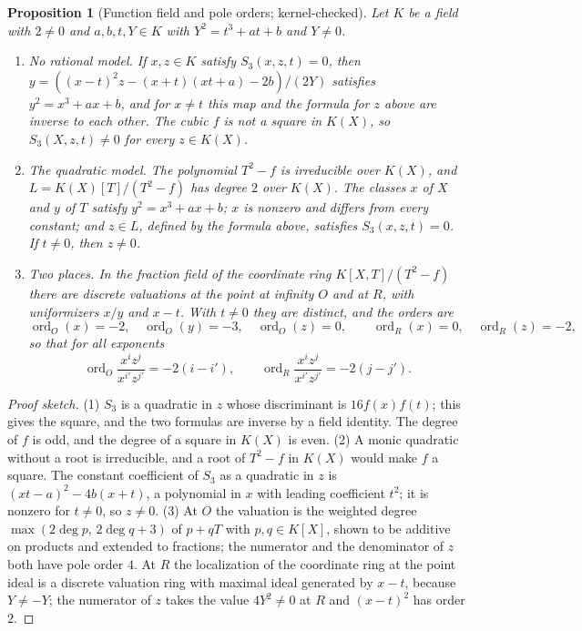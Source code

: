 \documentclass[11pt]{article}
\newtheorem{proposition}[theorem]{Proposition}
\theoremstyle{definition}\newtheorem{definition}[theorem]{Definition}
\theoremstyle{remark}\newtheorem{remark}[theorem]{Remark}
\begin{document}
\begin{proposition}[Function field and pole orders; kernel-checked]\label{prop:nontorsion}
Let $K$ be a field with $2\ne0$ and $a,b,t,Y\in K$ with $Y^2=t^3+at+b$
and $Y\ne0$.
\begin{enumerate}
\item \emph{No rational model.} If $x,z\in K$ satisfy $S_3(x,z,t)=0$, then
 $y=((x-t)^2z-(x+t)(xt+a)-2b)/(2Y)$ satisfies $y^2=x^3+ax+b$, and for
 $x\ne t$ this map and the formula for $z$ above are inverse to each other.
 The cubic $f$ is not a square in $K(X)$, so $S_3(X,z,t)\ne0$ for every
 $z\in K(X)$.
\item \emph{The quadratic model.} The polynomial $T^2-f$ is irreducible
 over $K(X)$, and $L=K(X)[T]/(T^2-f)$ has degree $2$ over $K(X)$. The
 classes $x$ of $X$ and $y$ of $T$ satisfy $y^2=x^3+ax+b$; $x$ is nonzero
 and differs from every constant; and $z\in L$, defined by the formula
 above, satisfies $S_3(x,z,t)=0$. If $t\ne0$, then $z\ne0$.
\item \emph{Two places.} In the fraction field of the coordinate ring
 $K[X,T]/(T^2-f)$ there are discrete valuations at the point at infinity $O$ and at $R$,
 with uniformizers $x/y$ and $x-t$. With $t\ne0$ they are distinct, and
 the orders are
 \[
 \operatorname{ord}_O(x)=-2,\quad \operatorname{ord}_O(y)=-3,\quad
 \operatorname{ord}_O(z)=0,\qquad
 \operatorname{ord}_R(x)=0,\quad \operatorname{ord}_R(z)=-2,
 \]
 so that for all exponents
 \[
 \operatorname{ord}_O\frac{x^iz^j}{x^{i'}z^{j'}}=-2(i-i'),\qquad
 \operatorname{ord}_R\frac{x^iz^j}{x^{i'}z^{j'}}=-2(j-j').
 \]
\end{enumerate}
\end{proposition}
\begin{proof}[Proof sketch]
(1) $S_3$ is a quadratic in $z$ whose discriminant is $16f(x)f(t)$; this
gives the square, and the two formulas are inverse by a field identity.
The degree of $f$ is odd, and the degree of a square in $K(X)$ is even.
(2) A monic quadratic without a root is irreducible, and a root of $T^2-f$
in $K(X)$ would make $f$ a square. The constant coefficient of $S_3$ as a
quadratic in $z$ is $(xt-a)^2-4b(x+t)$, a polynomial in $x$ with leading
coefficient $t^2$; it is nonzero for $t\ne0$, so $z\ne0$. (3) At $O$ the
valuation is the weighted degree $\max(2\deg p,\,2\deg q+3)$ of $p+qT$ with $p,q\in K[X]$,
shown to be additive on products and extended to fractions; the numerator
and the denominator of $z$ both have pole order $4$. At $R$ the
localization of the coordinate ring at the point ideal is a discrete
valuation ring with maximal ideal generated by $x-t$, because $Y\ne-Y$;
the numerator of $z$ takes the value $4Y^2\ne0$ at $R$ and $(x-t)^2$ has
order $2$.
\end{proof}
\end{document}
